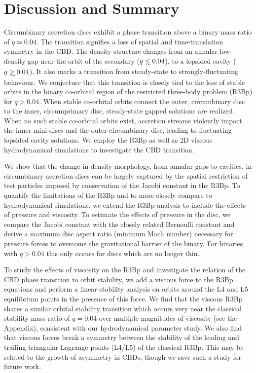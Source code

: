 \section{Discussion and Summary}
Circumbinary accretion discs exhibit a phase transition above a binary
mass ratio of $q \simeq 0.04$. The transition signifies a loss of
spatial and time-translation symmetry in the CBD. The density
structure changes from an annular low-density gap near the orbit of
the secondary ($q\lsim 0.04$), to a lopsided cavity ($q\gsim
0.04$). It also marks a transition from steady-state to
strongly-fluctuating behaviour. We conjecture that this transition is
closely tied to the loss of stable orbits in the binary co-orbital
region of the restricted three-body problem (R3Bp) for $q>0.04$.
When stable co-orbital orbits connect the outer, circumbinary disc to the inner, circumprimary disc, steady-state gapped solutions are realized. When no such stable co-orbital orbits exist, accretion streams violently impact the inner mini-discs and the outer circumbinary disc, leading to fluctuating lopsided cavity solutions. We
employ the R3Bp as well as 2D viscous hydrodynamical simulations to
investigate the CBD transition.


We show that the change in density morphology, from annular gaps to
cavities, in circumbinary accretion discs can be largely captured by
the spatial restriction of test particles imposed by conservation of
the Jacobi constant in the R3Bp. To quantify the limitations of the
R3Bp and to more closely compare to hydrodynamical simulations, we
extend the R3Bp analysis to include the effects of pressure and
viscosity. To estimate the effects of pressure in the disc, we compare
the Jacobi constant with the closely related Bernoulli constant and
derive a maximum disc aspect ratio (minimum Mach number) necessary for
pressure forces to overcome the gravitational barrier of the
binary. For binaries with $q>0.04$ this only occurs for discs which
are no longer thin.


To study the effects of viscosity on the R3Bp and investigate the
relation of the CBD phase transition to orbit stability, we add a
viscous force to the R3Bp equations and perform a linear-stability
analysis on orbits around the L4 and L5 equilibrium points in the
presence of this force. We find that the viscous R3Bp shares a similar
orbital stability transition which occurs very near the classical
stability mass ratio of $q=0.04$ over multiple magnitudes of viscosity
(see the Appendix), consistent with our hydrodynamical parameter
study.  We also find that viscous forces break a symmetry between the
stability of the leading and trailing triangular Lagrange points
(L4/L5) of the classical R3Bp. This may be related to the growth of
asymmetry in CBDs, though we save such a study for future work.


